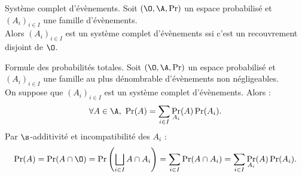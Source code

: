 \documentclass[11pt]{article}
\begin{document}
\vspace*{-0.8cm}

\begin{defi}{Système complet d'évènements.}{}
    Soit $(\O,\A,\Pr)$ un espace probabilisé et $(A_i)_{i\in I}$ une famille d'évènements.\\
    Alors $(A_i)_{i\in I}$ est un système complet d'évènements ssi c'est un recouvrement disjoint de $\O$.
\end{defi}

\vspace*{-0.8cm}

\begin{prop}{Formule des probabilités totales.}{}
    Soit $(\O,\A,\Pr)$ un espace probabilisé et $(A_i)_{i\in I}$ une famille au plus dénombrable d'évènements non négligeables.\\
    On suppose que $(A_i)_{i\in I}$ est un système complet d'évènements. Alors :
    \begin{equation*}
        \forall A \in \A, ~ \Pr(A) = \sum_{i\in I}\Pr_{A_i}(A)\Pr(A_i).
    \end{equation*}
    \tcblower
    Par $\s$-additivité et incompatibilité des $A_i$ :
    \begin{equation*}
        \Pr(A) = \Pr(A\cap \O) = \Pr\left(\bigsqcup_{i\in I} A\cap A_i \right) = \sum_{i\in I}\Pr(A\cap A_i) = \sum_{i\in I}\Pr_{A_i}(A)\Pr(A_i).
    \end{equation*}
\end{prop}

\vspace*{-0.8cm}
\end{document}
